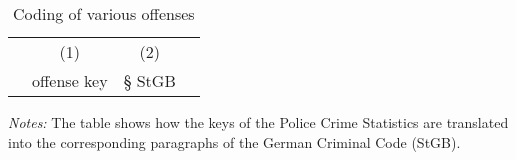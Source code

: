 \documentclass[11pt, a4paper]{article} %
\begin{document}
\vspace*{\fill}
\begin{table}[H]\centering
	\begin{threeparttable}\centering \caption{Coding of various offenses}\label{tab_soc_ext:offense_keys_code}
		\begin{tabular}{lccc}
			\toprule
			&\multicolumn{1}{c}{(1)}&\multicolumn{1}{c}{(2)}\\
			& offense key & § StGB \\
			\midrule
			
			\bottomrule
		\end{tabular}
		\begin{tablenotes}
			\item \scriptsize \emph{Notes:} The table shows how the keys of the Police Crime Statistics are translated into the corresponding paragraphs of the German Criminal Code (StGB).
		\end{tablenotes}
	\end{threeparttable}
\end{table}
\vspace*{\fill}\clearpage
\end{document}
